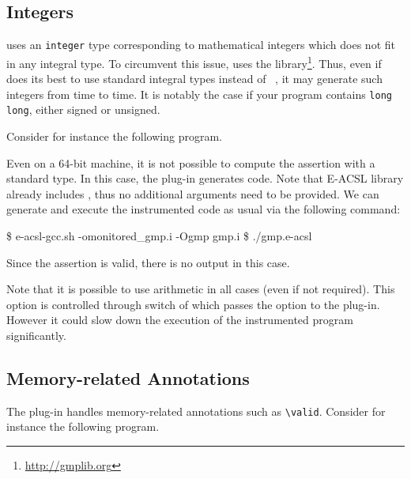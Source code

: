 
\subsection{Integers}
\label{sec:integers}

\eacsl uses an \texttt{integer} type corresponding to
mathematical integers which does not fit in any integral \C type. To circumvent
this issue, \eacsl uses the \gmp library\footnote{\url{http://gmplib.org}}.
Thus, even if \eacsl does its best to use standard integral types instead of
\gmp~\cite{kosmatov20rv}, it may generate such integers from time to time. It is
notably the case if your program contains \lstinline|long long|, either signed
or unsigned.

Consider for instance the following program.


Even on a 64-bit machine, it is not possible to compute the assertion with a
standard \C type. In this case, the \eacsl plug-in generates \gmp code.  Note
that E-ACSL library already includes \gmp, thus no additional arguments need to
be provided.  We can generate and execute the instrumented code as usual via
the following command:

\begin{shell}
\$ e-acsl-gcc.sh -omonitored_gmp.i -Ogmp gmp.i
\$ ./gmp.e-acsl
\end{shell}

Since the assertion is valid, there is no output in this case.

Note that it is possible to use \gmp arithmetic in all cases (even if not
required). This option is controlled through  switch of \eacslgcc
which passes the  option to the \eacsl
plug-in. However it could slow down the execution of the instrumented program
significantly.


\subsection{Memory-related Annotations}
\label{sec:memory}

The \eacsl plug-in handles memory-related annotations such as
\lstinline|\valid|.  Consider for instance the following program.

